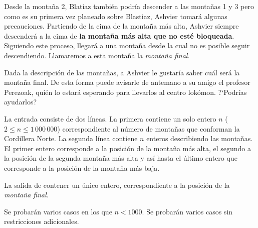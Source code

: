 \documentclass{oci}
\begin{document}
\begin{problemDescription}
Desde la montaña 2, Blatiaz también podría descender a las montañas 1 y 3 pero
como es su primera vez planeado sobre Blastiaz, Ashvier tomará algunas precauciones.
Partiendo de la cima de la montaña más alta, Ashvier siempre descenderá a la cima de
{\bf la montaña más alta que no esté bloqueada}.
Siguiendo este proceso, llegará a una montaña desde la cual no es posible seguir descendiendo.
Llamaremos a esta montaña la \emph{montaña final}.

Dada la descripción de las montañas, a Ashvier le gustaría saber cuál será la
montaña final.
De esta forma puede avisarle de antemano a su amigo el profesor Perezoak, quién lo estará
esperando para llevarlos al centro lokómon.
?`Podrías ayudarlos?




\end{problemDescription}

\begin{inputDescription}

La entrada consiste de dos líneas.
La primera contiene un solo entero $n$ ($2 \leq n \leq 1\,000\,000$)
correspondiente al número de montañas que conforman la Cordillera Norte.
La segunda línea contiene $n$ enteros describiendo las montañas.
El primer entero corresponde a la posición de la montaña más alta, el segundo a la posición
de la segunda montaña más alta y así hasta el último entero que corresponde a la posición
de la montaña más baja.

\end{inputDescription}

\begin{outputDescription}
La salida de contener un único entero, correspondiente a la posición de la \emph{montaña final}.
\end{outputDescription}

\begin{scoreDescription}
  Se probarán varios casos en los que $n<1000$.
  Se probarán varios casos sin restricciones adicionales.
\end{scoreDescription}

\begin{sampleDescription}
\end{sampleDescription}
\end{document}

